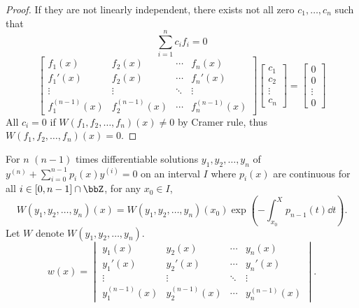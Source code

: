 \documentclass[a4paper,12pt]{report}
\begin{document}
\begin{proof}
If they are not linearly independent, there exists not all zero $c_1,\ldots,c_n$ such that
\[\sum_{i=1}^nc_if_i=0\]
\[\begin{bmatrix}
f_1(x) & f_2(x) & \cdots & f_n(x) \\
f_1'(x) & f_2(x) & \cdots & f_n'(x) \\
\vdots & \vdots & \ddots & \vdots \\
f_1^{(n-1)}(x) & f_2^{(n-1)}(x) & \cdots & f_n^{(n-1)}(x)
\end{bmatrix}\begin{bmatrix}c_1\\c_2\\\vdots\\c_n\end{bmatrix}=\begin{bmatrix}0\\0\\\vdots\\0\end{bmatrix}\]
All $c_i=0$ if $W(f_1,f_2,\ldots,f_n)(x)\ne 0$ by Cramer rule, thus $W(f_1,f_2,\ldots,f_n)(x)=0$.
\end{proof}
For $n$ $(n-1)$ times differentiable solutions $y_1,y_2,\ldots,y_n$ of $y^{(n)}+\sum_{i=0}^{n-1}p_i(x)y^{(i)}=0$ on an interval $I$ where $p_i(x)$ are continuous for all $i\in[0,n-1]\cap\bbZ$, for any $x_0\in I$,
\[W(y_1,y_2,\ldots,y_n)(x)=W(y_1,y_2,\ldots,y_n)(x_0)\exp(-\int_{x_0}^Xp_{n-1}(t)\dd{t}).\]
\bpr
Let $W$ denote $W(y_1,y_2,\ldots,y_n)$.
\[w(x)=\begin{vmatrix}
y_1(x) & y_2(x) & \cdots & y_n(x) \\
y_1'(x) & y_2'(x) & \cdots & y_n'(x) \\
\vdots & \vdots & \ddots & \vdots \\
y_1^{(n-1)}(x) & y_2^{(n-1)}(x) & \cdots & y_n^{(n-1)}(x)
\end{vmatrix}.\]
\end{document}
